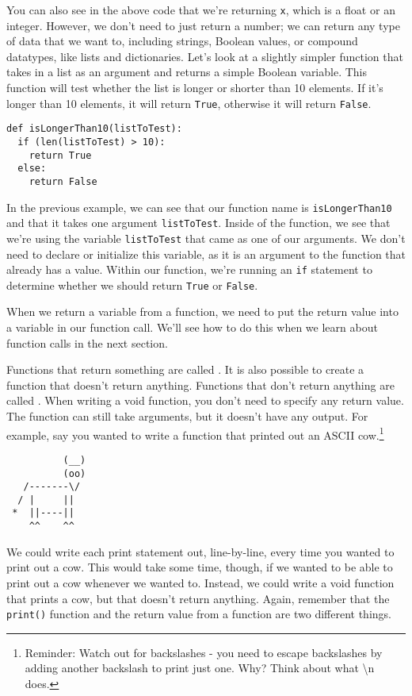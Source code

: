 You can also see in the above code that we're returning \verb|x|, which is a float or an integer. However, we don't need to just return a number; we can return any type of data that we want to, including strings, Boolean values, or compound datatypes, like lists and dictionaries. Let's look at a slightly simpler function that takes in a list as an argument and returns a simple Boolean variable. This function will test whether the list is longer or shorter than 10 elements. If it's longer than 10 elements, it will return \verb|True|, otherwise it will return \verb|False|.
\begin{lstlisting}[style=pippython]
def isLongerThan10(listToTest):
  if (len(listToTest) > 10):
    return True
  else:
    return False
\end{lstlisting}
In the previous example, we can see that our function name is \verb|isLongerThan10| and that it takes one argument \verb|listToTest|. Inside of the function, we see that we're using the variable \verb|listToTest| that came as one of our arguments. We don't need to declare or initialize this variable, as it is an argument to the function that already has a value. Within our function, we're running an \verb|if| statement to determine whether we should return \verb|True| or \verb|False|.\par
When we return a variable from a function, we need to put the return value into a variable in our function call. We'll see how to do this when we learn about function calls in the next section.\par
Functions that return something are called . It is also possible to create a function that doesn't return anything. Functions that don't return anything are called . When writing a void function, you don't need to specify any return value. The function can still take arguments, but it doesn't have any output. For example, say you wanted to write a function that printed out an ASCII cow.\footnote{Reminder: Watch out for backslashes - you need to escape backslashes by adding another backslash to print just one. Why? Think about what \textbackslash n does.}\par
\begin{lstlisting}
          (__)
          (oo)
   /-------\/
  / |     ||
 *  ||----||
    ^^    ^^
\end{lstlisting}
We could write each print statement out, line-by-line, every time you wanted to print out a cow. This would take some time, though, if we wanted to be able to print out a cow whenever we wanted to. Instead, we could write a void function that prints a cow, but that doesn't return anything. Again, remember that the \verb|print()| function and the return value from a function are two different things.\par
